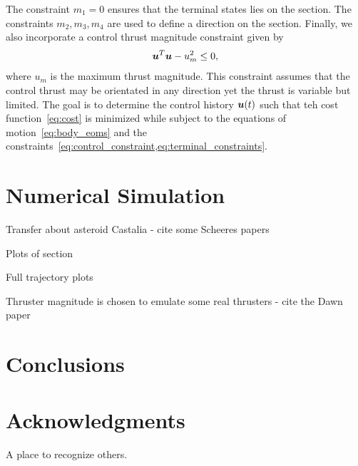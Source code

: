 \documentclass[]{aiaa-tc}%
\begin{document}
The constraint \( m_1 = 0 \) ensures that the terminal states lies on the \Poincare section.
The constraints \( m_2, m_3, m_4 \) are used to define a direction on the \Poincare section.
Finally, we also incorporate a control thrust magnitude constraint given by
\begin{align}\label{eq:control_constraint}
    \bm{u}^T \bm{u} - u_m^2 \leq 0 ,
\end{align}
where \( u_m \) is the maximum thrust magnitude.
This constraint assumes that the control thrust may be orientated in any direction yet the thrust is variable but limited.
The goal is to determine the control history \( \bm{u}(t) \) such that teh cost function~\cref{eq:cost} is minimized while subject to the equations of motion~\cref{eq:body_eoms} and the constraints~\cref{eq:control_constraint,eq:terminal_constraints}.


\section{Numerical Simulation}\label{sec:simulation}

Transfer about asteroid Castalia - cite some Scheeres papers

Plots of \Poincare section

Full trajectory plots

Thruster magnitude is chosen to emulate some real thrusters - cite the Dawn paper

\section{Conclusions}\label{sec:conclusions}


\section*{Acknowledgments}

A place to recognize others.



\end{document}
